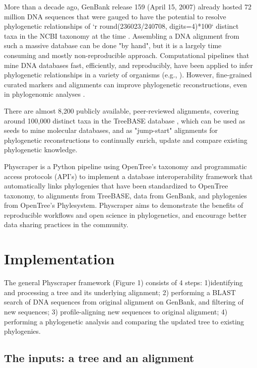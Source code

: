 \documentclass{bmcart}
\begin{document}
More than a decade ago, GenBank release 159 (April 15, 2007) already hosted 72
million DNA sequences that were gauged to have the potential to resolve phylogenetic
relationships of `r round(236023/240708, digits=4)*100`%
distinct taxa in the NCBI taxonomy at the time \cite{sanderson2008phylota}.
Assembling a DNA alignment from such a massive database can be done "by hand",
but it is a largely time consuming and mostly non-reproducible approach.
Computational pipelines that mine DNA databases fast, efficiently, and reproducibly,
have been applied to infer phylogenetic relationships in a variety of organisms
(e.g., \cite{smith2009mega, antonelli2017toward, izquierdo2014pumper}).
However, fine-grained curated markers and alignments can improve phylogenetic
reconstructions, even in phylogenomic analyses \cite{fragoso2017pilot}.

There are almost 8,200 publicly available, peer-reviewed alignments, covering
around 100,000 distinct taxa in the TreeBASE database \cite{piel2009treebase}, which
can be used as seeds to mine molecular databases, and as "jump-start" alignments
for phylogenetic reconstructions \cite{morrison2006multiple} to continually enrich,
update and compare existing phylogenetic knowledge.

Physcraper is a Python pipeline using OpenTree's taxonomy and programmatic access
protocols (API's) to implement a database interoperability framework that automatically
links phylogenies that have been standardized to OpenTree taxonomy, to alignments
from TreeBASE, data from GenBank, and phylogenies from OpenTree's Phylesystem.
Physcraper aims to demonstrate the benefits of reproducible workflows and open
science in phylogenetics, and encourage better data sharing practices in the community.


\section*{Implementation}

The general Physcraper framework (Figure 1) consists of 4 steps: 1)identifying and
processing a tree and its underlying alignment; 2) performing a BLAST search of
DNA sequences from original alignment on GenBank, and filtering of new sequences;
3) profile-aligning new sequences to original alignment; 4) performing a phylogenetic
analysis and comparing the updated tree to existing phylogenies.

\subsection*{The inputs: a tree and an alignment}
\end{document}
